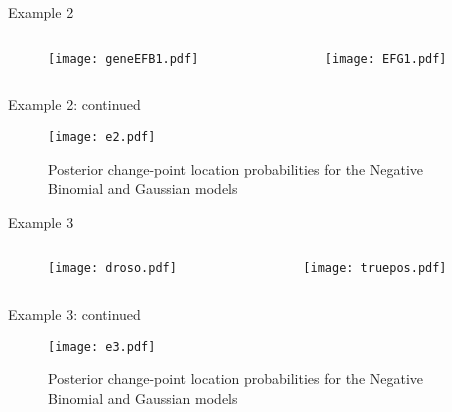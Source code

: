 \documentclass[a4paper]{beamer}
\begin{document}
\begin{frame}{Example 2}
  \begin{columns}
    \begin{column}{6cm}
    \begin{figure}
    \centering
    \texttt{[image: geneEFB1.pdf]}
  \end{figure}
    \end{column}
    \begin{column}{6cm}
    \begin{figure}
    \centering
    \texttt{[image: EFG1.pdf]}
  \end{figure}
     \end{column}
  \end{columns}
\end{frame}

\begin{frame}{Example 2: continued}
	\begin{figure}
		\texttt{[image: e2.pdf]}
		\caption{Posterior change-point location probabilities for the Negative Binomial and Gaussian models}
	\end{figure}
\end{frame}


\begin{frame}{Example 3}
  \begin{columns}
    \begin{column}{6cm}
    \begin{figure}
    \centering
    \texttt{[image: droso.pdf]}
  \end{figure}
    \end{column}
    \begin{column}{6cm}
    \begin{figure}
    \centering
    \texttt{[image: truepos.pdf]}
  \end{figure}
     \end{column}
  \end{columns}
\end{frame}

\begin{frame}{Example 3: continued}
	\begin{figure}
		\texttt{[image: e3.pdf]}
    \caption{Posterior change-point location probabilities for the Negative Binomial and Gaussian models}
	\end{figure}
\end{frame}
\end{document}
